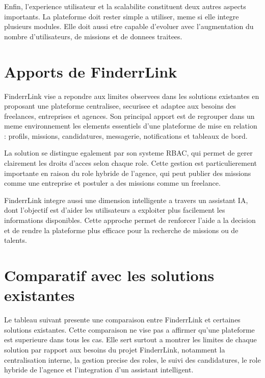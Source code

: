 Enfin, l'experience utilisateur et la scalabilite constituent deux autres aspects importants. La plateforme doit rester simple a utiliser, meme si elle integre plusieurs modules. Elle doit aussi etre capable d'evoluer avec l'augmentation du nombre d'utilisateurs, de missions et de donnees traitees.

\section{Apports de FinderrLink}

FinderrLink vise a repondre aux limites observees dans les solutions existantes en proposant une plateforme centralisee, securisee et adaptee aux besoins des freelances, entreprises et agences. Son principal apport est de regrouper dans un meme environnement les elements essentiels d'une plateforme de mise en relation : profils, missions, candidatures, messagerie, notifications et tableaux de bord.

La solution se distingue egalement par son systeme RBAC, qui permet de gerer clairement les droits d'acces selon chaque role. Cette gestion est particulierement importante en raison du role hybride de l'agence, qui peut publier des missions comme une entreprise et postuler a des missions comme un freelance.

FinderrLink integre aussi une dimension intelligente a travers un assistant IA, dont l'objectif est d'aider les utilisateurs a exploiter plus facilement les informations disponibles. Cette approche permet de renforcer l'aide a la decision et de rendre la plateforme plus efficace pour la recherche de missions ou de talents.
\section{Comparatif avec les solutions existantes}

Le tableau suivant presente une comparaison entre FinderrLink et certaines solutions existantes. Cette comparaison ne vise pas a affirmer qu'une plateforme est superieure dans tous les cas. Elle sert surtout a montrer les limites de chaque solution par rapport aux besoins du projet FinderrLink, notamment la centralisation interne, la gestion precise des roles, le suivi des candidatures, le role hybride de l'agence et l'integration d'un assistant intelligent.

